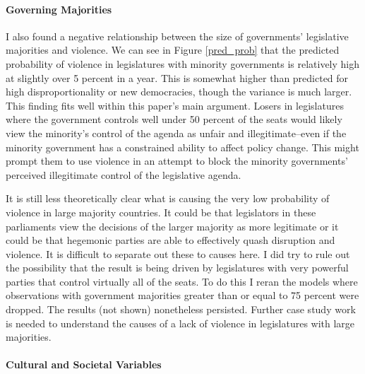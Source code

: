 \documentclass[a4paper]{article}\usepackage{graphicx, color}
\begin{document}
\paragraph{Governing Majorities}

I also found a negative relationship between the size of governments' legislative majorities and violence. We can see in Figure \ref{pred_prob} that the predicted probability of violence in legislatures with minority governments is relatively high at slightly over 5 percent in a year. This is somewhat higher than predicted for high disproportionality or new democracies, though the variance is much larger. This finding fits well within this paper's main argument. Losers in legislatures where the government controls well under 50 percent of the seats would likely view the minority's control of the agenda as unfair and illegitimate--even if the minority government has a constrained ability to affect policy change. This might prompt them to use violence in an attempt to block the minority governments' perceived illegitimate control of the legislative agenda. 

It is still less theoretically clear what is causing the very low probability of violence in large majority countries. It could be that legislators in these parliaments view the decisions of the larger majority as more legitimate or it could be that hegemonic parties are able to effectively quash disruption and violence. It is difficult to separate out these to causes here. I did try to rule out the possibility that the result is being driven by legislatures with very powerful parties that control virtually all of the seats. To do this I reran the models where observations with government majorities greater than or equal to 75 percent were dropped. The results (not shown) nonetheless persisted. Further case study work is needed to understand the causes of a lack of violence in legislatures with large majorities.

\paragraph{Cultural and Societal Variables}
\end{document}

